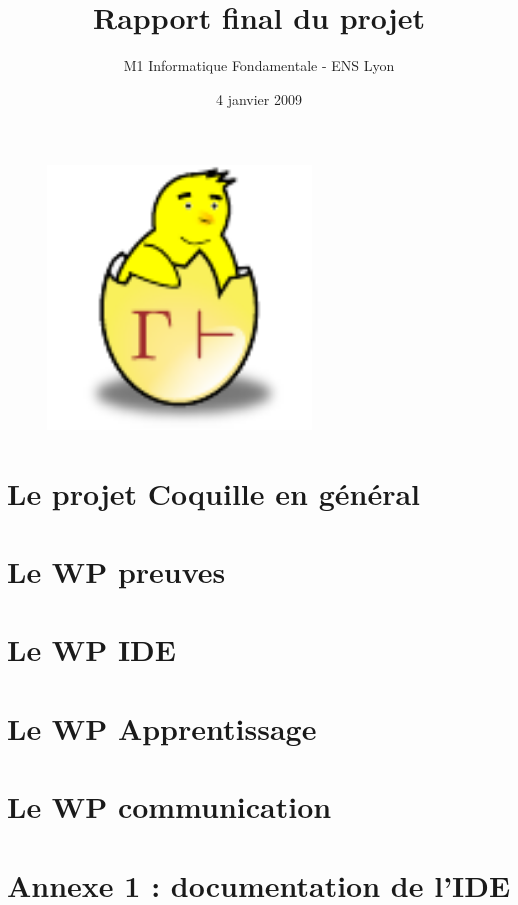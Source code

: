 \documentclass[a4paper,10pt]{report}
\date{4 janvier 2009}
\title{Rapport final du projet \coquille{}}
\author{M1 Informatique Fondamentale - ENS Lyon}
\begin{document}
\begin{figure}
\begin{center}
 \includegraphics[width=7cm]{../images/common/poussin.pdf}
\end{center}
\end{figure}

\maketitle

\newpage

\tableofcontents

\chapter{Le projet Coquille en g\'en\'eral}


\chapter{Le WP preuves}


\chapter{Le WP IDE}


\chapter{Le WP Apprentissage}


\chapter{Le WP communication}





\chapter{Annexe 1 : documentation de l'IDE}
%
\end{document}
